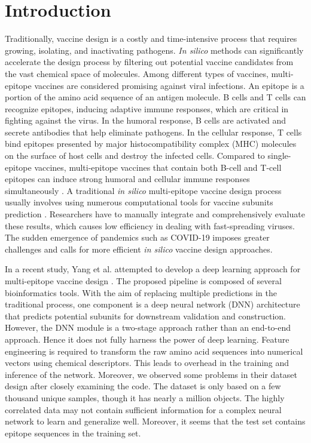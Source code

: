 \documentclass[conference]{IEEEtran}
\begin{document}
\section{Introduction}
Traditionally, vaccine design is a costly and time-intensive process that requires growing, isolating, and inactivating pathogens. \emph{In silico} methods can significantly accelerate the design process by filtering out potential vaccine candidates from the vast chemical space of molecules. Among different types of vaccines, multi-epitope vaccines are considered promising against viral infections. An epitope is a portion of the amino acid sequence of an antigen molecule. B cells and T cells can recognize epitopes, inducing adaptive immune responses, which are critical in fighting against the virus. In the humoral response, B cells are activated and secrete antibodies that help eliminate pathogens. In the cellular response, T cells bind epitopes presented by major histocompatibility complex (MHC) molecules on the surface of host cells and destroy the infected cells. Compared to single-epitope vaccines, multi-epitope vaccines that contain both B-cell and T-cell epitopes can induce strong humoral and cellular immune responses simultaneously \cite{Zhang_2017}. A traditional \emph{in silico} multi-epitope vaccine design process usually involves using numerous computational tools for vaccine subunits prediction \cite{Yang_2021}. Researchers have to manually integrate and comprehensively evaluate these results, which causes low efficiency in dealing with fast-spreading viruses. The sudden emergence of pandemics such as COVID-19 imposes greater challenges and calls for more efficient \emph{in silico} vaccine design approaches.

In a recent study, Yang et al. attempted to develop a deep learning approach for multi-epitope vaccine design \cite{Yang_2021}. The proposed pipeline is composed of several bioinformatics tools. With the aim of replacing multiple predictions in the traditional process, one component is a deep neural network (DNN) architecture that predicts potential subunits for downstream validation and construction. However, the DNN module is a two-stage approach rather than an end-to-end approach. Hence it does not fully harness the power of deep learning. Feature engineering is required to transform the raw amino acid sequences into numerical vectors using chemical descriptors. This leads to overhead in the training and inference of the network. Moreover, we observed some problems in their dataset design after closely examining the code. The dataset is only based on a few thousand unique samples, though it has nearly a million objects. The highly correlated data may not contain sufficient information for a complex neural network to learn and generalize well. Moreover, it seems that the test set contains epitope sequences in the training set.
\end{document}

